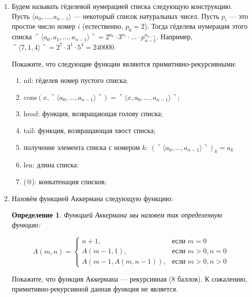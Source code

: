 \documentclass[10pt,a4paper,oneside]{article}
\newtheorem{definition}{Определение}
\begin{document}
\begin{enumerate}
\item Будем называть гёделевой нумерацией списка следующую конструкцию. Пусть $\langle a_0, \dots, a_{n-1} \rangle$ --- некоторый
список натуральных чисел. Пусть $p_i$ --- это простое число номер $i$ (естественно, $p_0 = 2$).
Тогда гёделева нумерация этого списка $\ulcorner \langle a_0, a_1, \dots, a_{n-1} \rangle \urcorner = 
2^{a_0} \cdot 3^{a_1} \cdot \dots \cdot p_{n-1}^{a_{n-1}}$.
Например, $\ulcorner \langle 7,1,4 \rangle\urcorner = 2^7 \cdot 3^1 \cdot 5^4 = 240000$.

Покажите, что следующие функции являются примитивно-рекурсивными:

\begin{enumerate}
\item nil: гёделев номер пустого списка;
\item $\textrm{cons}(x,\ulcorner\langle a_0,\dots,a_{n-1}\rangle\urcorner) = \ulcorner\langle x,a_0,\dots,a_{n-1}\rangle\urcorner$;
\item head: функция, возвращающая голову списка;
\item tail: функция, возвращающая хвост списка;
\item получение элемента списка с номером $k$: $(\ulcorner\langle a_0, \dots, a_{n-1} \rangle\urcorner)_k = a_k$
\item len: длина списка;
\item (@): конкатенация списков;
\end{enumerate}

\item Назовём функцией Аккермана следующую функцию:

\begin{definition}Функцией \emph{Аккермана} мы назовем так определенную 
функцию:

$$A(m,n) = \left\{\begin{array}{rl}
   n+1, & \mbox{если $m = 0$}\\
   A(m-1,1), & \mbox{если $m > 0, n = 0$}\\
   A(m-1,A(m,n-1)), & \mbox{если $m > 0, n > 0$}
\end{array}\right.$$
\end{definition}

Покажите, что функция Аккермана --- рекурсивная (8 баллов).
К сожалению, примитивно-рекурсивной данная функция не является.
\end{enumerate}
\end{document}
